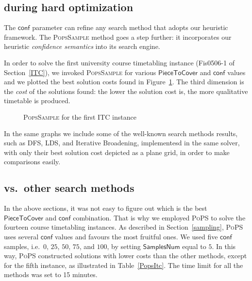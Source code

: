 \documentclass{ws-ijait}
\begin{document}
\subsection{\PopsSample{} during hard
            optimization\label{PoPS}}

The $\mathsf{conf}$ parameter can refine any search method
that adopts our heuristic framework. The \textsc{PopsSample}
method goes a step further: it incorporates our heuristic
\emph{confidence semantics} into its search engine.

In order to solve the first university course timetabling
instance (\textsf{Fis0506-1} of Section~\ref{ITC}), we
invoked \textsc{PopsSample} for various
$\mathsf{PieceToCover}$ and $\mathsf{conf}$ values and we
plotted the best solution costs found in Figure~\ref{ITC1}.
The third dimension is the \emph{cost} of the solutions
found: the lower the solution cost is, the more qualitative
timetable is produced.

\begin{figure}
  \centering
  
  \caption{{\normalfont\textsc{PopsSample}} for the first
           ITC instance\label{ITC1}}
\end{figure}

In the same graphs we include some of the well-known search
methods results, such as DFS, LDS, and Iterative Broadening,
implementesd in the same solver, with only their best
solution cost depicted as a plane grid, in order to make
comparisons easily.

\subsection{\PoPS{} vs.\ other search methods}

In the above sections, it was not easy to figure out which
is the best $\mathsf{PieceToCover}$ and $\mathsf{conf}$
combination. That is why we employed \textsc{PoPS} to solve
the fourteen course timetabling instances. As described in
Section~\ref{sampling}, \textsc{PoPS} uses several
$\mathsf{conf}$ values and favours the most fruitful ones.
We used five $\mathsf{conf}$ samples, i.e.\ $0$, $25$, $50$,
$75$, and $100$, by setting $\mathsf{SamplesNum}$ equal to
$5$. In this way, \textsc{PoPS} constructed solutions with
lower costs than the other methods, except for the fifth
instance, as illustrated in Table~\ref{PopsItc}. The time
limit for all the methods was set to 15 minutes.
\end{document}
